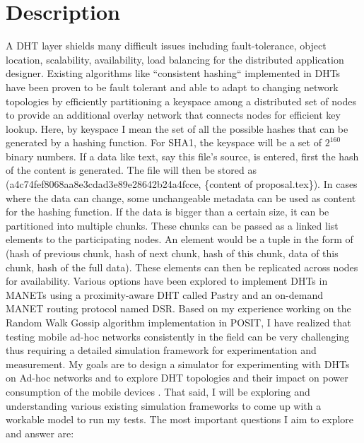 \documentclass[a4paper,10pt]{article}
\newcommand{\cmt}[2]{#2}
\begin{document}

\section*{Description}
A DHT layer shields many difficult issues including fault-tolerance, \cmt{locating object}{object location}, scalability, availability, load balancing for \cmt{}{the} distributed application designer\cite{Saumitra04howto}. Existing algorithms like ``consistent hashing`` implemented in DHTs have been proven to be fault tolerant and able to adapt to changing network topologies by efficiently partitioning a keyspace among \cmt{}{a} distributed set of nodes \cmt{and}{to} provide an additional overlay network \cmt{which connects nodes such that the node responsible for any key can be efficiently located}{that connects nodes for efficient key lookup}\cite{consistentHashing}. Here, by keyspace I mean the set of all the possible hashes that can be generated by a hashing function. For SHA1, the keyspace will be a set of $2^160$ binary numbers. If a data like text, say this file's source, is entered, first the hash of the content is generated. The file will then be stored as (a4c74fef8068aa8e3cdad3e89e28642b24a4fcce, \{content of proposal.tex\}). In cases where the data can change, some unchangeable metadata can be used as content for the hashing function. If the data is bigger than a certain size, it can be partitioned into multiple chunks. These chunks can be passed as a linked list elements to the participating nodes. An element would be a tuple in the form of (hash of previous chunk, hash of next chunk, hash of this chunk, data of this chunk, hash of the full data).  These elements can then be replicated across nodes for availability. Various options have been explored to implement DHTs in MANETs using a proximity-aware DHT \cmt{}{called} Pastry\cite{Rowstron01pastry:scalable} and \cmt{}{an} on-demand MANET routing protocol \cmt{}{named} DSR\cite{Johnson02dynamicsource}. Based on my experience working on the Random Walk Gossip algorithm implementation \cmt{on}{in} POSIT\cite{positRWG}, I have realized that testing mobile ad-hoc networks consistently in the field can be very challenging \cmt{without}{thus requiring} a detailed \cmt{test}{} simulation \cmt{}{framework} \cmt{to base it on}{for experimentation and measurement}. My goals are to design a simulator for experimenting with DHTs on Ad-hoc networks\cmt{,}{ and to} explor\cmt{ing}{e} \cmt{network}{DHT} topologies and \cmt{}{their impact on} power consumption \cmt{in the}{of the mobile} devices \cmt{communicating}{}. That said, I will be exploring and understanding various existing simulation frameworks to come up with a workable model to run my tests. The most important questions I aim to explore and answer are:
\end{document}
